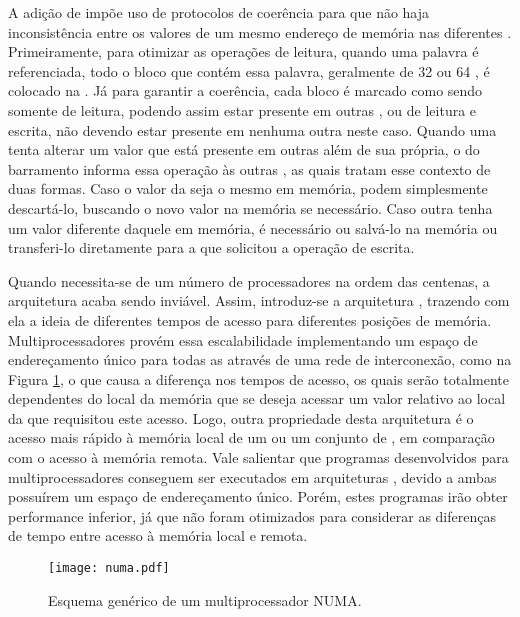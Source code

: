 A adição de \caches impõe uso de protocolos de coerência para que não haja inconsistência entre os valores de um mesmo endereço de memória nas diferentes \caches. Primeiramente, para otimizar as operações de leitura, quando uma palavra é referenciada, todo o bloco que contém essa palavra, geralmente de 32 ou 64 \bytes, é colocado na \cache. Já para garantir a coerência, cada bloco é marcado como sendo somente de leitura, podendo assim estar presente em outras \caches, ou de leitura e escrita, não devendo estar presente em nenhuma outra \cache neste caso. Quando uma \CPU tenta alterar um valor que está presente em outras \caches além de sua própria, o \hardware do barramento informa essa operação às outras \caches, as quais tratam esse contexto de duas formas. Caso o valor da \cache seja o mesmo em memória, podem simplesmente descartá-lo, buscando o novo valor na memória se necessário. Caso outra \cache tenha um valor diferente daquele em memória, é necessário ou salvá-lo na memória ou transferi-lo diretamente para a \cache que solicitou a operação de escrita.

Quando necessita-se de um número de processadores na ordem das centenas, a arquitetura \UMA acaba sendo inviável. Assim, introduz-se a arquitetura \NUMA, trazendo com ela a ideia de diferentes tempos de acesso para diferentes posições de memória. Multiprocessadores \NUMA provém essa escalabilidade implementando um espaço de endereçamento único para todas as \CPUs através de uma rede de interconexão, como na Figura \ref{fig:multiprocessadornuma}, o que causa a diferença nos tempos de acesso, os quais serão totalmente dependentes do local da memória que se deseja acessar um valor relativo ao local da \CPU que requisitou este acesso. Logo, outra propriedade desta arquitetura é o acesso mais rápido à memória local de um ou um conjunto de \CPUs, em comparação com o acesso à memória remota. Vale salientar que programas desenvolvidos para multiprocessadores \UMA conseguem ser executados em arquiteturas \NUMA, devido a ambas possuírem um espaço de endereçamento único. Porém, estes programas irão obter performance inferior, já que não foram otimizados para considerar as diferenças de tempo entre acesso à memória local e remota.

\begin{figure}[tb]
  \centering
  \caption{Esquema genérico de um multiprocessador NUMA.}
  \label{fig:multiprocessadornuma}
  \texttt{[image: numa.pdf]}
\end{figure}

